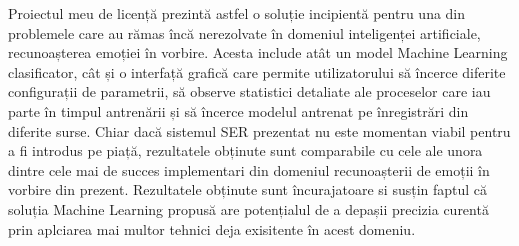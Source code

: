 \documentclass[a4paper,12pt]{book}
\begin{document}
		Proiectul meu de licență prezintă astfel o soluție incipientă pentru una din problemele care au rămas încă nerezolvate în domeniul inteligenței artificiale, recunoașterea emoției în vorbire. Acesta include atât un model Machine Learning clasificator, cât și o interfață grafică care permite utilizatorului să încerce diferite configurații de parametrii, să observe statistici detaliate ale proceselor care iau parte în timpul antrenării și să încerce modelul antrenat pe înregistrări din diferite surse. Chiar dacă sistemul SER prezentat nu este momentan viabil pentru a fi introdus pe piață, rezultatele obținute sunt comparabile cu cele ale unora dintre cele mai de succes implementari din domeniul recunoașterii de emoții în vorbire din prezent. Rezultatele obținute sunt încurajatoare si susțin faptul că soluția Machine Learning propusă are potențialul de a depașii precizia curentă prin aplciarea mai multor tehnici deja exisitente în acest domeniu.		
			
		\renewcommand{\clearpage}{}
		\printbibliography[title={Bibliografie},notcategory=cited,resetnumbers=true]
		\printbibliography[title={Referinte},category=cited,resetnumbers=true]
		\newpage
\end{document}
